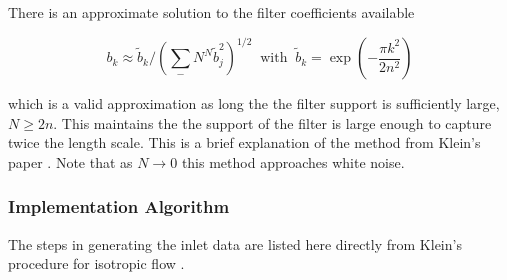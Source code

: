 There is an approximate solution to the filter coefficients available

\begin{equation} \label{eq:DFGfiltercoef}
b_k \approx \tilde{b}_k \big/ \left(  \sum_-N^N  \tilde{b}_j^2 \right)^{1/2} \; \; \text{with} \; \; \tilde{b}_k = \exp \left( - \frac{ \pi k^2}{2 n^2} \right)
\end{equation}

which is a valid approximation as long the the filter support is sufficiently large, $N \geq 2n$.  This maintains the the support of the filter is large enough to capture twice the length scale. This is a brief explanation of the method from Klein's paper \cite{Klein2003}. Note that as $ N \rightarrow 0$ this method approaches white noise.

\subsubsection{Implementation Algorithm}
The steps in generating the inlet data are listed here directly from Klein's procedure for isotropic flow \cite{Klein2003}.

